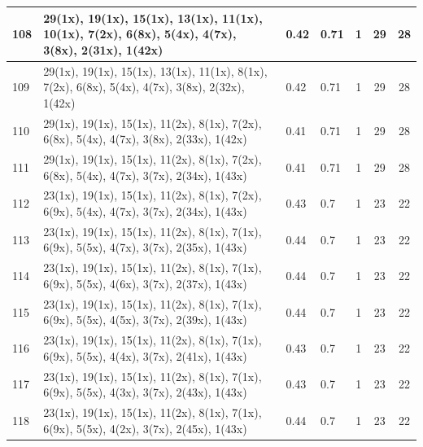 \begin{small}
\begin{longtable}{|p{0.5cm}|p{9cm}|p{1.3cm}|p{1.3cm}|c|c|c|}
  108 & 29(1x), 19(1x), 15(1x), 13(1x), 11(1x), 10(1x), 7(2x), 6(8x), 5(4x), 4(7x), 3(8x), 2(31x), 1(42x) & \cellcolor{colorGood}  0.42 & \cellcolor{colorGood} 0.71 & 1 & 29 & \cellcolor{colorBad} 28 \\   \hline
  109 & 29(1x), 19(1x), 15(1x), 13(1x), 11(1x), 8(1x), 7(2x), 6(8x), 5(4x), 4(7x), 3(8x), 2(32x), 1(42x) & \cellcolor{colorGood}  0.42 & \cellcolor{colorGood} 0.71 & 1 & 29 & \cellcolor{colorBad} 28 \\   \hline
  110 & 29(1x), 19(1x), 15(1x), 11(2x), 8(1x), 7(2x), 6(8x), 5(4x), 4(7x), 3(8x), 2(33x), 1(42x) & \cellcolor{colorGood}  0.41 & \cellcolor{colorGood} 0.71 & 1 & 29 & \cellcolor{colorBad} 28 \\   \hline
  111 & 29(1x), 19(1x), 15(1x), 11(2x), 8(1x), 7(2x), 6(8x), 5(4x), 4(7x), 3(7x), 2(34x), 1(43x) & \cellcolor{colorGood}  0.41 & \cellcolor{colorGood} 0.71 & 1 & 29 & \cellcolor{colorBad} 28 \\   \hline
  112 & 23(1x), 19(1x), 15(1x), 11(2x), 8(1x), 7(2x), 6(9x), 5(4x), 4(7x), 3(7x), 2(34x), 1(43x) & \cellcolor{colorGood}  0.43 & \cellcolor{colorGood} 0.7 & 1 & 23 & \cellcolor{colorBad} 22 \\   \hline
  113 & 23(1x), 19(1x), 15(1x), 11(2x), 8(1x), 7(1x), 6(9x), 5(5x), 4(7x), 3(7x), 2(35x), 1(43x) & \cellcolor{colorGood}  0.44 & \cellcolor{colorGood} 0.7 & 1 & 23 & \cellcolor{colorBad} 22 \\   \hline
  114 & 23(1x), 19(1x), 15(1x), 11(2x), 8(1x), 7(1x), 6(9x), 5(5x), 4(6x), 3(7x), 2(37x), 1(43x) & \cellcolor{colorGood}  0.44 & \cellcolor{colorGood} 0.7 & 1 & 23 & \cellcolor{colorBad} 22 \\   \hline
  115 & 23(1x), 19(1x), 15(1x), 11(2x), 8(1x), 7(1x), 6(9x), 5(5x), 4(5x), 3(7x), 2(39x), 1(43x) & \cellcolor{colorGood}  0.44 & \cellcolor{colorGood} 0.7 & 1 & 23 & \cellcolor{colorBad} 22 \\   \hline
  116 & 23(1x), 19(1x), 15(1x), 11(2x), 8(1x), 7(1x), 6(9x), 5(5x), 4(4x), 3(7x), 2(41x), 1(43x) & \cellcolor{colorGood}  0.43 & \cellcolor{colorGood} 0.7 & 1 & 23 & \cellcolor{colorBad} 22 \\   \hline
  117 & 23(1x), 19(1x), 15(1x), 11(2x), 8(1x), 7(1x), 6(9x), 5(5x), 4(3x), 3(7x), 2(43x), 1(43x) & \cellcolor{colorGood}  0.43 & \cellcolor{colorGood} 0.7 & 1 & 23 & \cellcolor{colorBad} 22 \\   \hline
  118 & 23(1x), 19(1x), 15(1x), 11(2x), 8(1x), 7(1x), 6(9x), 5(5x), 4(2x), 3(7x), 2(45x), 1(43x) & \cellcolor{colorGood}  0.44 & \cellcolor{colorGood} 0.7 & 1 & 23 & \cellcolor{colorBad} 22 \\   \hline

\end{longtable}
\end{small}
